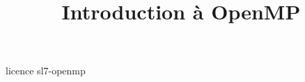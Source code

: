 \documentclass {beamer}
\title {Introduction à OpenMP}
\begin{document}
 {licence}
 {sl7-openmp}
\end{document}
